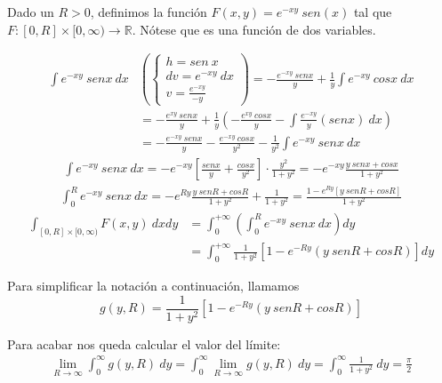     \begin{sol}
        Dado un $R > 0$, definimos la función $F(x,y) = e^{-xy} \ sen(x)$ tal que $F : [0, R] \times [0, \infty) \rightarrow \mathbb R$. Nótese que es una función de dos variables.

        \begin{align*}
            \label{}
            \int e^{-xy} \ sen x \ dx &\left( \begin{cases}
                h = sen \ x \\
                dv = e^{-xy} \ dx \\
                v = \frac{e^{-xy}}{-y}
    \end{cases} \right) = - \frac{e^{-xy} \ sen x}{y} + \frac{1}{y} \int e^{-xy} \ cos x \ dx \\
                                      &= - \frac{e^{xy} \ sen x}{y} + \frac{1}{y} \left( - \frac{e^{xy} \ cos x}{y} - \int \frac{e^{-xy}}{y}(sen x) \ dx \right) \\
                                      &= - \frac{e^{-xy} \ sen x}{y} - \frac{e^{-xy} \ cos x}{y^2} - \frac{1}{y^2} \int e^{-xy} \ sen x \ dx
        \end{align*}
        \begin{align*}
            \label{}
            \int e^{-xy} \ sen x \ dx = -e^{-xy} \left[ \frac{sen x}{y} + \frac{cos x}{y^2} \right] \cdot \frac{y^2}{1+y^2} = -e^{-xy} \frac{y \ sen x + cos x}{1 + y^2}
        \end{align*}
        \begin{align*}
            \label{}
            \int_0^{R} e^{-xy} \ sen x \ dx = -e^{Ry} \frac{y \ sen R + cosR}{1+y^2} + \frac{1}{1 + y^2} = \frac{1 - e^{Ry} [y \ senR + cosR]}{1 + y^2}
        \end{align*}
                \begin{align*}
            \label{}
            \int_{[0, R] \times [0, \infty)} F(x,y) \ dxdy &= \int_{0}^{+\infty} \left( \int_0^{R} e^{-xy} \ senx \ dx \right) dy \\
                                                           &= \int_0^{+\infty} \frac{1}{1+y^2} \left[ 1 - e^{-Ry} (y \ sen R + cos R) \right] dy
        \end{align*}

    Para simplificar la notación a continuación, llamamos $$ g(y, R) =  \frac{1}{1+y^2} \left[ 1 - e^{-Ry} (y \ sen R + cos R) \right]$$

        Para acabar nos queda calcular el valor del límite:
        \begin{align*}
            \label{}
            \lim_{R \to \infty} \int_0^{\infty} g(y, R) \ dy = \int_0^{\infty} \lim_{R \to \infty} g(y,R) \ dy = \int_{0}^{\infty} \frac{1}{1+y^2} \ dy = \frac{\pi}{2}
        \end{align*}


\end{sol}
